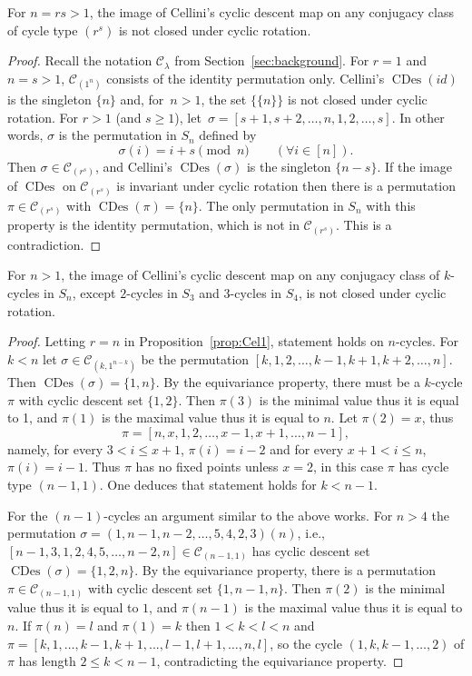 \documentclass[ALCO,published]{cedram}
\newcommand{\C}{\mathcal C}
\DeclareMathOperator\CDes{CDes}
\begin{document}
\begin{proposition}\label{prop:Cel1}
	For $n = rs > 1$, the image of Cellini's cyclic descent map on any conjugacy class of cycle type $(r^s)$ is not closed under cyclic rotation.
\end{proposition}
	
\begin{proof}
	Recall the notation $\C_\lambda$ from Section~\ref{sec:background}.
	For $r=1$ and $n = s > 1$, $\C_{(1^n)}$ consists of the identity permutation only. Cellini's $\CDes(id)$ is the singleton $\{n\}$ and, for~$n > 1$, the set $\{\{n\}\}$ is not closed under cyclic rotation.
	For $r>1$ (and $s \ge 1$), 
    let~$\sigma = [s+1,s+2,\dots,n,1,2,\dots,s]$.
    In other words, $\sigma$ is the permutation in $S_n$ defined by 
	\[
		\sigma(i) = i+s \pmod{n} \qquad (\forall i\in [n]).
	\]
	Then $\sigma \in \C_{(r^s)}$, 
    and Cellini's $\CDes(\sigma)$ is the singleton $\{n-s\}$. 
    If the image of $\CDes$ on $\C_{(r^s)}$ is invariant under cyclic rotation then there is a permutation $\pi \in \C_{(r^s)}$ with $\CDes(\pi) = \{n\}$. The only permutation in $S_n$ with this property is the identity permutation, which is not in $\C_{(r^s)}$. This is a contradiction.
\end{proof}
	
\begin{proposition}
	For $n > 1$, the image of Cellini's cyclic descent map on any conjugacy class of $k$-cycles in $S_n$, except $2$-cycles in $S_3$ and $3$-cycles in $S_4$, is not closed under cyclic rotation.
\end{proposition}
	
\begin{proof}
	Letting $r=n$ in Proposition~\ref{prop:Cel1}, statement holds on $n$-cycles.
	For $k<n$ let $\sigma\in \C_{(k,1^{n-k})}$ be the permutation $[k,1,2,\dots,k-1,k+1,k+2,\dots,n]$. Then $\CDes(\sigma)=\{1,n\}$.
	By the equivariance property,  there must be a $k$-cycle $\pi$ with cyclic descent set $\{1,2\}$. Then $\pi(3)$ is the minimal value thus it is equal to 1, and $\pi(1)$
	is the maximal value thus it is equal to $n$. Let $\pi(2)=x$, thus
	\[
		\pi=[n,x,1,2,\dots,x-1,x+1,\dots,n-1],
	\]
	namely, for every $3<i\le x+1$, $\pi(i)=i-2$ and for every $x+1<i\le n$, $\pi(i)=i-1$. Thus $\pi$ has no fixed points unless $x=2$, in this case $\pi$
	has cycle type $(n-1,1)$.  One deduces that statement holds for $k<n-1$.
		
	For the $(n-1)$-cycles an argument similar to the above works. For $n>4$ the permutation $\sigma=(1,n-1,n-2,\ldots,5,4,2,3)(n)$, i.e., $[n-1,3,1,2,4,5,\ldots,n-2,n]\in \C_{(n-1,1)}$ has cyclic descent set $\CDes(\sigma)=\{1,2,n\}$. 
	By the equivariance property, there is a permutation $\pi\in \C_{(n-1,1)}$ with cyclic descent set $\{1,n-1,n\}$. Then $\pi(2)$ is the minimal value thus it is equal to $1$, and $\pi(n-1)$ is the maximal value thus it is equal to $n$. If $\pi(n)=l$ and $\pi(1)=k$ then $1<k<l<n$ and $\pi=[k,1,\dots,k-1,k+1,...,l-1,l+1,\dots,n,l]$, 
	so the cycle $(1,k,k-1,\ldots,2)$ of $\pi$ has length $2\le k<n-1$,  
	contradicting the equivariance property.
\end{proof}
\end{document}
